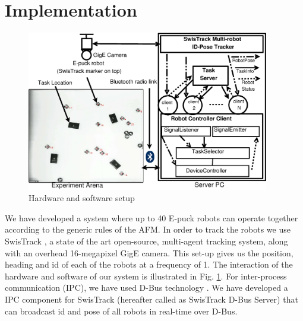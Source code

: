 \documentclass{llncs}
\begin{document}
\section{Implementation}
\label{sec:impl}
\begin{figure}
\centering
\includegraphics[height=7cm, angle=0]
{../dia-files/RIL-Expt-Setup1.eps}
\caption{\small Hardware and software setup}
\label{fig:setup} %
\end{figure}
We have developed a system where up to 40 E-puck robots \cite{Epuck} can operate together according to the generic rules of the AFM. In order to track the robots we use SwisTrack \cite{SwisTrack}, a state of the art open-source, multi-agent tracking system, along with an overhead 16-megapixel GigE camera. This set-up gives us the position, heading and id of each of the robots at a frequency of 1. The interaction of the hardware and software of our system is illustrated in Fig. \ref{fig:setup}. 
For inter-process communication (IPC), we have used D-Bus technology \cite{DBus}. We have developed a IPC component for SwisTrack (hereafter called as SwisTrack D-Bus Server) that can broadcast id and pose of all robots in real-time over D-Bus.
\end{document}
